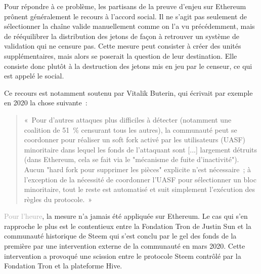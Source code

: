 
Pour répondre à ce problème, les partisans de la preuve d'enjeu sur Ethereum prônent généralement le recours à l'accord social. Il ne s'agit pas seulement de sélectionner la chaîne valide manuellement comme on l'a vu précédemment, mais de rééquilibrer la distribution des jetons de façon à retrouver un système de validation qui ne censure pas. Cette mesure peut consister à créer des unités supplémentaires, mais alors se poserait la question de leur destination. Elle consiste donc plutôt à la destruction des jetons mis en jeu par le censeur, ce qui est appelé le  social.

Ce recours est notamment soutenu par Vitalik Buterin, qui écrivait par exemple en 2020 la chose suivante~:

\begin{quote}
«~Pour d'autres attaques plus difficiles à détecter (notamment une coalition de 51~\% censurant tous les autres), la communauté peut se coordonner pour réaliser un soft fork activé par les utilisateurs (UASF) minoritaire dans lequel les fonds de l'attaquant sont [...] largement détruits (dans Ethereum, cela se fait via le "mécanisme de fuite d'inactivité"). Aucun "hard fork pour supprimer les pièces" explicite n'est nécessaire~; à l'exception de la nécessité de coordonner l'UASF pour sélectionner un bloc minoritaire, tout le reste est automatisé et suit simplement l'exécution des règles du protocole.~»
\end{quote}


\textcolor{darkgray}{Pour l'heure}, la mesure n'a jamais été appliquée sur Ethereum. Le cas qui s'en rapproche le plus est le contentieux entre la Fondation Tron de Justin Sun et la communauté historique de Steem qui s'est conclu par le gel des fonds de la première par une intervention externe de la communauté en mars 2020. Cette intervention a provoqué une scission entre le protocole Steem contrôlé par la Fondation Tron et la plateforme Hive.

